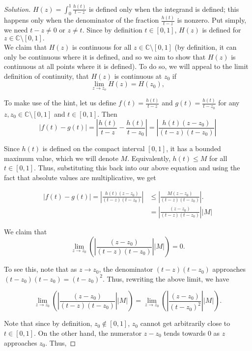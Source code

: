 \documentclass[11pt]{article}
\newcommand{\C}{\mathbb{C}}
\newenvironment{solution}
  {\renewcommand\qedsymbol{$\blacksquare$}\begin{proof}[Solution]}
  {\end{proof}}
\theoremstyle{definition}
\begin{document}
\begin{solution}
$H(z) = \int_0^1 \frac{h(t)}{t-z}$ is defined only when the integrand is defined; this happens only when the denominator of the fraction $\frac{h(t)}{t-z}$ is nonzero. Put simply, we need $t - z \neq 0$ or $z \neq t$. Since by definition $t \in [0, 1]$, $H(z)$ is defined for $z \in \C \setminus [0, 1].$ \\

We claim that $H(z)$ is continuous for all $z \in \C \setminus [0, 1]$ (by definition, it can only be continuous where it is defined, and so we aim to show that $H(z)$ is continuous at all points where it is defined). To do so, we will appeal to the limit definition of continuity, that $H(z)$ is continuous at $z_0$ if \[ \lim\limits_{z \rightarrow z_o} H(z) = H(z_0), \]

To make use of the hint, let us define $f(t) = \frac{h(t)}{t-z}$ and $g(t) = \frac{h(t)}{t-z_0}$ for any $z, z_0 \in \C \setminus [0, 1]$ and $t \in [0, 1]$. Then
\[ |f(t) - g(t) |= \left| \frac{h(t)}{t-z} - \frac{h(t)}{t-z_0} \right| = \left| \frac{h(t)(z-z_0)}{(t-z)(t-z_0)}\right|\]

Since $h(t)$ is defined on the compact interval $[0, 1]$, it has a bounded maximum value, which we will denote $M$. 
Equivalently, $h(t) \leq M$ for all $t \in [0, 1]$. Thus, substituting this back into our above equation and using the fact that absolute values are multiplicative, we get

\begin{align*}  |f(t) - g(t)| = \left| \frac{h(t)(z-z_0)}{(t-z)(t-z_0)}\right| & \leq \left| \frac{M(z-z_0)}{(t-z)(t-z_0)}\right|. \\
&= \left| \frac{(z-z_0)}{(t-z)(t-z_0)}\right| |M|\end{align*}

We claim that \[ \lim\limits_{z \rightarrow z_0} \left(\left| \frac{(z-z_0)}{(t-z)(t-z_0)}\right| |M| \right) = 0. \]

To see this, note that as $z \rightarrow z_0$, the denominator $(t-z)(t-z_0)$ approaches $(t-z_0)(t-z_0) = (t-z_0)^2$. Thus, rewriting the above limit, we have

\[ \lim\limits_{z \rightarrow z_0} \left(\left| \frac{(z-z_0)}{(t-z)(t-z_0)}\right| |M| \right) =  \lim\limits_{z \rightarrow z_0} \left(\left| \frac{(z-z_0)}{(t-z_0)^2}\right| |M| \right) . \]

Note that since by definition, $z_0 \notin [0, 1]$, $z_0$ cannot get arbitrarily close to $t \in [0, 1]$. On the other hand, the numerator $z-z_0$ tends towards $0$ as $z$ approaches $z_0$. Thus, 


\end{solution}
\end{document}
